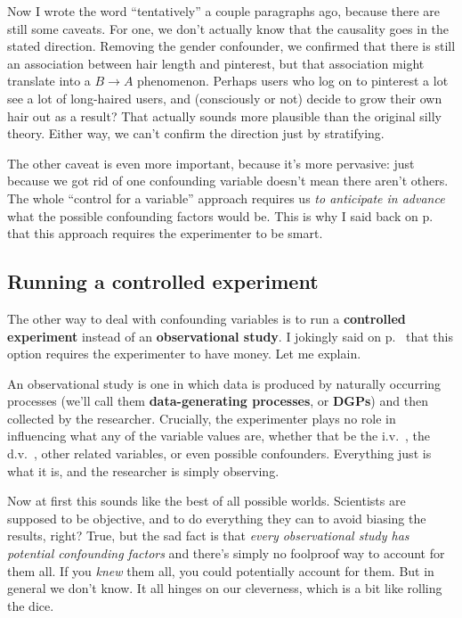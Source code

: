 
Now I wrote the word ``tentatively'' a couple paragraphs ago, because there are
still some caveats. For one, we don't actually know that the causality goes in
the stated direction. Removing the gender confounder, we confirmed that there
is still an association between hair length and pinterest, but that association
might translate into a $B \rightarrow A$ phenomenon. Perhaps users who log on
to pinterest a lot see a lot of long-haired users, and (consciously or not)
decide to grow their own hair out as a result? That actually sounds more
plausible than the original silly theory. Either way, we can't confirm the
direction just by stratifying.

The other caveat is even more important, because it's more pervasive: just
because we got rid of one confounding variable doesn't mean there aren't
others. The whole ``control for a variable'' approach requires us \textit{to
anticipate in advance} what the possible confounding factors would be. This is
why I said back on p.~\pageref{smart} that this approach requires the
experimenter to be smart.

\subsection{Running a controlled experiment}


The other way to deal with confounding variables is to run a \textbf{controlled
experiment} instead of an \textbf{observational study}. I jokingly said on
p.~\pageref{smart} that this option requires the experimenter to have money.
Let me explain.

An observational study is one in which data is produced by naturally occurring
processes (we'll call them \textbf{data-generating processes}, or
\textbf{DGPs}) and then collected by the researcher.
Crucially, the experimenter plays no role in influencing what any of the
variable values are, whether that be the i.v.~, the d.v.~, other related
variables, or even possible confounders. Everything just is what it is, and the
researcher is simply observing.

Now at first this sounds like the best of all possible worlds. Scientists are
supposed to be objective, and to do everything they can to avoid biasing the
results, right? True, but the sad fact is that \textit{every observational
study has potential confounding factors} and there's simply no foolproof way to
account for them all. If you \textit{knew} them all, you could potentially
account for them. But in general we don't know. It all hinges on our
cleverness, which is a bit like rolling the dice.

